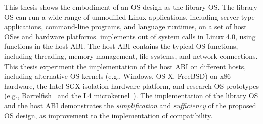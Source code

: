This thesis shows the embodiment of an OS design as the \graphene{} library OS.
The \graphene{} library OS can run a wide range of unmodified Linux applications,
including server-type applications, command-line programs, and language runtimes, on a set of host OSes and hardware platforms.
\graphene{} implements  \graphenesyscalls{} out of \linuxsyscalls{} system calls in Linux 4.0,
using \palcalls{} functions in the host ABI.
The host ABI contains the typical OS functions, including threading, memory management, file systems, and network connections.
This thesis experiment the implementation of the host ABI on different hosts,
including alternative OS kernels (e.g., Windows, OS X, FreeBSD) on x86 hardware,
the Intel SGX isolation hardware platform,
and research OS prototypes (e.g., Barrelfish~\cite{baumann09barrelfish} and the L4 microkernel~\cite{l4family}).
The implementation of the \graphene{} library OS and the host ABI demonstrates the {\em simplification} and {\em sufficiency} of the proposed OS design, as improvement to the implementation of compatibility.








